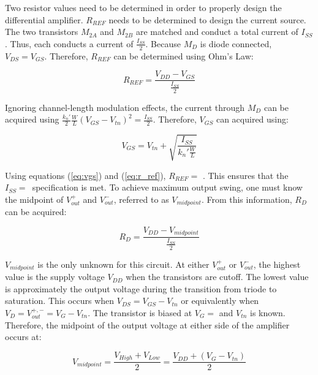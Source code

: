Two resistor values need to be determined in order to properly design the differential amplifier.
$R_{REF}$ needs to be determined to design the current source.
The two transistors $M_{2A}$ and $M_{2B}$ are matched and conduct a total current of $I_{SS}$.
Thus, each conducts a current of $\frac{I_{SS}}{2}$.
Because $M_{D}$ is diode connected, $V_{DS} = V_{GS}$.
Therefore, $R_{REF}$ can be determined using Ohm's Law:

\begin{equation}
	\label{eq:r_ref}
	R_{REF} = \frac{ V_{DD} - V_{GS} }{ \frac{I_{SS}}{2} }
\end{equation}

Ignoring channel-length modulation effects, the current through $M_{D}$ can be acquired using $\frac{k_{n}'}{2} \frac{W}{L} ( V_{GS} - V_{tn} )^{2} = \frac{ I_{SS} }{ 2 }$.
Therefore, $V_{GS}$ can acquired using:

\begin{equation}
	\label{eq:vgs}
	V_{GS} = V_{tn} + \sqrt{\frac{ I_{SS} }{ k_{n}' \frac{W}{L} }}
\end{equation}

Using equations (\ref{eq:vgs}) and (\ref{eq:r_ref}), $R_{REF} = $ \rref.
This ensures that the $I_{SS} = $\iss \ specification is met.
To achieve maximum output swing, one must know the midpoint of $V_{out}^{+}$ and $V_{out}^{-}$, referred to as $V_{midpoint}$.
From this information, $R_{D}$ can be acquired:

\begin{equation}
	\label{eq:r_d}
	R_{D} = \frac{ V_{DD} - V_{midpoint} }{ \frac{ I_{SS} }{ 2 } }
\end{equation}

$V_{midpoint}$ is the only unknown for this circuit.
At either $V_{out}^{+}$ or $V_{out}^{-}$, the highest value is the supply voltage $V_{DD}$ when the transistors are cutoff.
The lowest value is approximately the output voltage during the transition from triode to saturation.
This occurs when $V_{DS} = V_{GS} - V_{tn}$ or equivalently when $V_{D} = V_{out}^{+,-} = V_{G} - V_{tn}$.
The transistor is biased at $V_{G} = $ \vbias and $V_{tn}$ is known.
Therefore, the midpoint of the output voltage at either side of the amplifier occurs at:

\begin{equation}
	\label{eq:v_midpoint}
	V_{midpoint} = \frac{ V_{High} + V_{Low} }{ 2 } = \frac{ V_{DD} + ( V_{G} - V_{tn} ) }{ 2 }
\end{equation}

